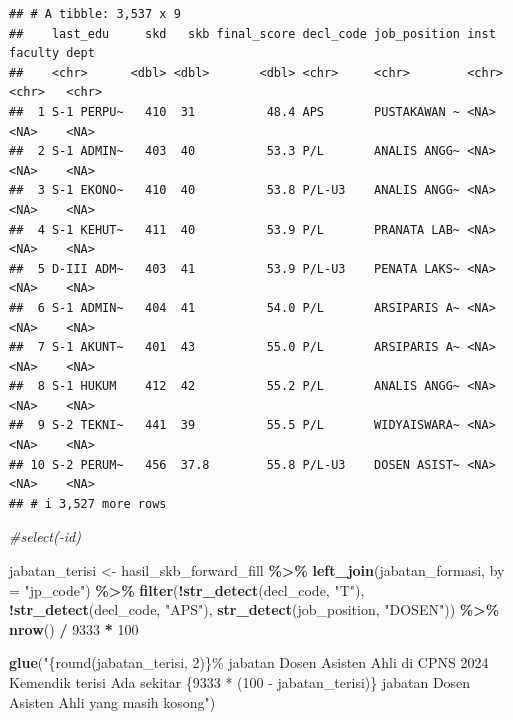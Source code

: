 \documentclass[
]{article}
\newenvironment{Shaded}{\begin{snugshade}}{\end{snugshade}}
\newcommand{\AttributeTok}[1]{\textcolor[rgb]{0.13,0.29,0.53}{#1}}
\newcommand{\CommentTok}[1]{\textcolor[rgb]{0.56,0.35,0.01}{\textit{#1}}}
\newcommand{\DecValTok}[1]{\textcolor[rgb]{0.00,0.00,0.81}{#1}}
\newcommand{\FunctionTok}[1]{\textcolor[rgb]{0.13,0.29,0.53}{\textbf{#1}}}
\newcommand{\NormalTok}[1]{#1}
\newcommand{\OtherTok}[1]{\textcolor[rgb]{0.56,0.35,0.01}{#1}}
\newcommand{\SpecialCharTok}[1]{\textcolor[rgb]{0.81,0.36,0.00}{\textbf{#1}}}
\newcommand{\StringTok}[1]{\textcolor[rgb]{0.31,0.60,0.02}{#1}}
\begin{document}
\begin{verbatim}
## # A tibble: 3,537 x 9
##    last_edu     skd   skb final_score decl_code job_position inst  faculty dept 
##    <chr>      <dbl> <dbl>       <dbl> <chr>     <chr>        <chr> <chr>   <chr>
##  1 S-1 PERPU~   410  31          48.4 APS       PUSTAKAWAN ~ <NA>  <NA>    <NA> 
##  2 S-1 ADMIN~   403  40          53.3 P/L       ANALIS ANGG~ <NA>  <NA>    <NA> 
##  3 S-1 EKONO~   410  40          53.8 P/L-U3    ANALIS ANGG~ <NA>  <NA>    <NA> 
##  4 S-1 KEHUT~   411  40          53.9 P/L       PRANATA LAB~ <NA>  <NA>    <NA> 
##  5 D-III ADM~   403  41          53.9 P/L-U3    PENATA LAKS~ <NA>  <NA>    <NA> 
##  6 S-1 ADMIN~   404  41          54.0 P/L       ARSIPARIS A~ <NA>  <NA>    <NA> 
##  7 S-1 AKUNT~   401  43          55.0 P/L       ARSIPARIS A~ <NA>  <NA>    <NA> 
##  8 S-1 HUKUM    412  42          55.2 P/L       ANALIS ANGG~ <NA>  <NA>    <NA> 
##  9 S-2 TEKNI~   441  39          55.5 P/L       WIDYAISWARA~ <NA>  <NA>    <NA> 
## 10 S-2 PERUM~   456  37.8        55.8 P/L-U3    DOSEN ASIST~ <NA>  <NA>    <NA> 
## # i 3,527 more rows
\end{verbatim}

\begin{Shaded}
\begin{Highlighting}[]
  \CommentTok{\#select({-}id)}
\end{Highlighting}
\end{Shaded}

\begin{Shaded}
\begin{Highlighting}[]
\NormalTok{jabatan\_terisi }\OtherTok{\textless{}{-}}\NormalTok{ hasil\_skb\_forward\_fill }\SpecialCharTok{\%\textgreater{}\%} 
  \FunctionTok{left\_join}\NormalTok{(jabatan\_formasi, }\AttributeTok{by =} \StringTok{"jp\_code"}\NormalTok{) }\SpecialCharTok{\%\textgreater{}\%} 
  \FunctionTok{filter}\NormalTok{(}\SpecialCharTok{!}\FunctionTok{str\_detect}\NormalTok{(decl\_code, }\StringTok{"T"}\NormalTok{),}
         \SpecialCharTok{!}\FunctionTok{str\_detect}\NormalTok{(decl\_code, }\StringTok{"APS"}\NormalTok{),}
         \FunctionTok{str\_detect}\NormalTok{(job\_position, }\StringTok{"DOSEN"}\NormalTok{)) }\SpecialCharTok{\%\textgreater{}\%} 
  \FunctionTok{nrow}\NormalTok{() }\SpecialCharTok{/} \DecValTok{9333} \SpecialCharTok{*} \DecValTok{100}

\FunctionTok{glue}\NormalTok{(}\StringTok{"\{round(jabatan\_terisi, 2)\}\% jabatan Dosen Asisten Ahli di CPNS 2024 Kemendik terisi}
\StringTok{     Ada sekitar \{9333 * (100 {-} jabatan\_terisi)\} jabatan Dosen Asisten Ahli yang masih kosong"}\NormalTok{)}
\end{Highlighting}
\end{Shaded}
\end{document}
